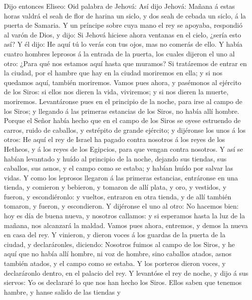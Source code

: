  Dijo entonces Eliseo: Oid palabra de Jehová: Así dijo
Jehová: Mañana á estas horas valdrá el seah de flor de harina un siclo,
y dos seah de cebada un siclo, á la puerta de Samaria.  Y
un príncipe sobre cuya mano el rey se apoyaba, respondió al varón de
Dios, y dijo: Si Jehová hiciese ahora ventanas en el cielo, ¿sería esto
así? Y él dijo: He aquí tú lo verás con tus ojos, mas no comerás de
ello.  Y había cuatro hombres leprosos á la entrada de la
puerta, los cuales dijeron el uno al otro: ¿Para qué nos estamos aquí
hasta que muramos?  Si tratáremos de entrar en la ciudad,
por el hambre que hay en la ciudad moriremos en ella; y si nos quedamos
aquí, también moriremos. Vamos pues ahora, y pasémonos al ejército de
los Siros: si ellos nos dieren la vida, viviremos; y si nos dieren la
muerte, moriremos.  Levantáronse pues en el principio de
la noche, para irse al campo de los Siros; y llegando á las primeras
estancias de los Siros, no había allí hombre.  Porque el
Señor había hecho que en el campo de los Siros se oyese estruendo de
carros, ruido de caballos, y estrépito de grande ejército; y dijéronse
los unos á los otros: He aquí el rey de Israel ha pagado contra nosotros
á los reyes de los Hetheos, y á los reyes de los Egipcios, para que
vengan contra nosotros.  Y así se habían levantado y huído
al principio de la noche, dejando sus tiendas, sus caballos, sus asnos,
y el campo como se estaba; y habían huído por salvar las vidas.
 Y como los leprosos llegaron á las primeras estancias,
entráronse en una tienda, y comieron y bebieron, y tomaron de allí
plata, y oro, y vestidos, y fueron, y escondiéronlo: y vueltos, entraron
en otra tienda, y de allí también tomaron, y fueron, y escondieron.
 Y dijéronse el uno al otro: No hacemos bien: hoy es día
de buena nueva, y nosotros callamos: y si esperamos hasta la luz de la
mañana, nos alcanzará la maldad. Vamos pues ahora, entremos, y demos la
nueva en casa del rey.  Y vinieron, y dieron voces á los
guardas de la puerta de la ciudad, y declaráronles, diciendo: Nosotros
fuimos al campo de los Siros, y he aquí que no había allí hombre, ni voz
de hombre, sino caballos atados, asnos también atados, y el campo como
se estaba.  Y los porteros dieron voces, y declaráronlo
dentro, en el palacio del rey.  Y levantóse el rey de
noche, y dijo á sus siervos: Yo os declararé lo que nos han hecho los
Siros. Ellos saben que tenemos hambre, y hanse salido de las tiendas y
